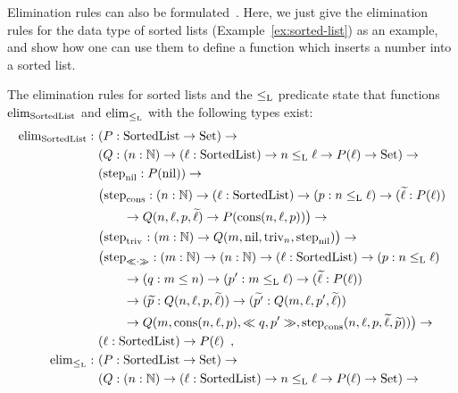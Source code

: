 \documentclass{article}
\begin{document}
Elimination rules can also be
formulated~\cite{nordvallforsbergAltenkirchMorrisSetzer2011catsemindind}. Here,
we just give the elimination rules for the data type of sorted lists
(Example~\ref{ex:sorted-list}) as an example, and show how one can use them to
define a function which inserts a number into a sorted list.

\begin{example}
  The elimination rules for sorted lists and the $\leq_{\text{L}}$ predicate
  state that functions $\text{elim}_{\text{SortedList}}$ and $\text{elim}_{\leq_{\text{L}}}$
  with the following types exist:
  \begin{align*}
    \elim_{\SortedList} :\ & (P : \SortedList \to \Set) \to \\
                       & (Q : (n : \Nat) \to (\ell : \SortedList) \to n \lessList \ell \to P(\ell) \to \Set) \to \\
                       & (\stepind{\nilList} : P(\nilList)) \to \\
                       & \big(\stepind{\consListbare} : (n : \Nat) \to (\ell : \SortedList) \to (p : n \lessList \ell) \to (\stepindarg{\ell} : P(\ell)) \\
                       & \qquad \to Q(n, \ell, p, \stepindarg{\ell}) \to P(\consList{n}{\ell}{p})\big) \to \\
                       & \big(\stepind{\nilLess{}} : (m : \Nat) \to Q(m, \nilList, \nilLess{n}, \stepind{\nilList})\big) \to \\
                       & \big(\stepind{\consLessbare} : (m : \Nat) \to (n : \Nat) \to (\ell : \SortedList) \to (p : n \lessList \ell) \\
                       & \qquad \to (q : m \leq n) \to (p' : m \lessList \ell) \to
                       (\stepindarg{\ell} : P(\ell)) \\ 
                       & \qquad \to (\stepindarg{p} : Q(n, \ell,p, \stepindarg{\ell}))
                       \to (\stepindarg{p'} : Q(m, \ell, p', \stepindarg{\ell})) \\
                       & \qquad \to Q(m,\consList{n}{\ell}{p}, \consLess{m}{n}{\ell}{p}{q}{p'}, \stepind{\consListbare}(n, \ell, p, \stepindarg{\ell}, \stepindarg{p}))\big) \to \\
                       & (\ell : \SortedList) \to P(\ell) \enspace , \\
% 
     \elim_{\lessList} :\ & (P : \SortedList \to \Set) \to \\
                       & (Q : (n : \Nat) \to (\ell : \SortedList) \to n \lessList \ell \to P(\ell) \to \Set) \to \\

\end{align*}
\end{example}
\end{document}
